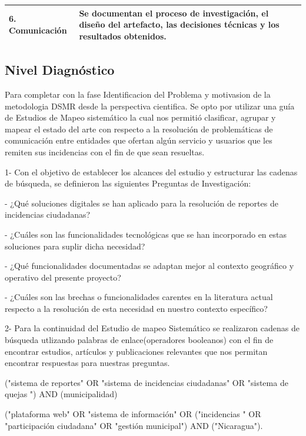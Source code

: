 \begin{table}[htbp]
\begin{tabularx}{\textwidth}{X X}
		\addlinespace
		\midrule
		
		6. Comunicación &
		Se documentan el proceso de investigación, el diseño del artefacto, las decisiones técnicas y los resultados obtenidos. \\
		
		\bottomrule
	\end{tabularx}
\end{table}

\newpage
\subsection{Nivel Diagnóstico}

Para completar con la fase Identificacion del Problema y motivasion  de la metodologia DSMR desde la perspectiva cientifica. Se opto por utilizar una guía de Estudios de Mapeo sistemático \cite{petersen2008systematic} la cual nos permitió clasificar, agrupar y mapear el estado del arte con respecto a la resolución de problemáticas de comunicación entre entidades que ofertan algún servicio y usuarios que les remiten sus incidencias con el fin de que sean resueltas.\newline 

1- Con el objetivo de establecer los alcances del estudio y estructurar las cadenas de búsqueda, se definieron las siguientes Preguntas de Investigación:

-	¿Qué soluciones digitales se han aplicado para la resolución de reportes de incidencias ciudadanas?

-	¿Cuáles son las funcionalidades tecnológicas que se han incorporado en estas soluciones para suplir dicha necesidad?

-	¿Qué funcionalidades documentadas se adaptan mejor al contexto geográfico y operativo del presente proyecto?

-  ¿Cuáles son las brechas o funcionalidades carentes en la literatura actual respecto a la resolución de esta necesidad en nuestro contexto específico?


2- Para la continuidad del Estudio de mapeo Sistemático se realizaron cadenas de búsqueda utlizando palabras de enlace(operadores booleanos) con el fin de encontrar estudios, artículos y publicaciones relevantes que nos permitan encontrar respuestas para nuestras preguntas.

("sistema de reportes" OR "sistema de incidencias ciudadanas" OR "sistema de quejas ") AND (municipalidad) 

("plataforma web" OR "sistema de información" OR ("incidencias " OR "participación ciudadana" OR "gestión municipal") AND ("Nicaragua").

